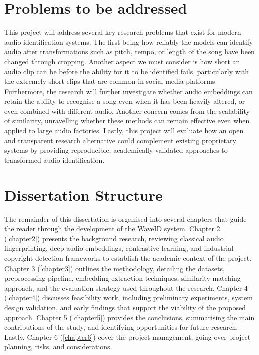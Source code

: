 \documentclass[../Thesis]{subfiles}
\begin{document}
\section{Problems to be addressed}
This project will address several key research problems that exist for modern audio identification systems. The first being how reliably the models can identify audio after transformations such as pitch, tempo, or length of the song have been changed through cropping. Another aspect we must consider is how short an audio clip can be before the ability for it to be identified fails, particularly with the extremely short clips that are common in social-media platforms. Furthermore, the research will further investigate whether audio embeddings can retain the ability to recognise a song even when it has been heavily altered, or even combined with different audio. Another concern comes from the scalability of similarity, unravelling whether these methods can remain effective even when applied to large audio factories. Lastly, this project will evaluate how an open and transparent research alternative could complement existing proprietary systems by providing reproducible, academically validated approaches to transformed audio identification.
\section{Dissertation Structure}
The remainder of this dissertation is organised into several chapters that guide the reader through the development of the WaveID system. Chapter 2 (\ref{chapter2}) presents the background research, reviewing classical audio fingerprinting, deep audio embeddings, contrastive learning, and industrial copyright detection frameworks to establish the academic context of the project. Chapter 3 (\ref{chapter3}) outlines the methodology, detailing the datasets, preprocessing pipeline, embedding extraction techniques, similarity-matching approach, and the evaluation strategy used throughout the research. Chapter 4 (\ref{chapter4}) discusses feasibility work, including preliminary experiments, system design validation, and early findings that support the viability of the proposed approach. Chapter 5 (\ref{chapter5}) provides the conclusions, summarising the main contributions of the study, and identifying opportunities for future research. Lastly, Chapter 6 (\ref{chapter6}) cover the project management, going over project planning, risks, and considerations.
\end{document}

